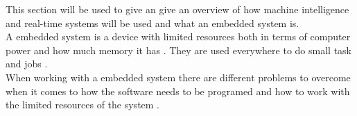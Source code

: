 This section will be used to give an give an overview of how machine
intelligence and real-time systems will be used and what an embedded system
is.\\

A embedded system is a device with limited resources both in terms of computer
power and how much memory it has \PS. They are used everywhere to do small task
and jobs \PS.\\

When working with a embedded system there are different problems to overcome
when it comes to how the software needs to be programed and how to work with the
limited resources of the system \PS.\\

%
%
